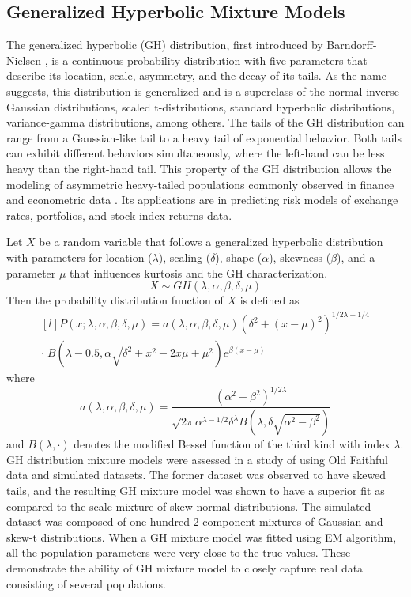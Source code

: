 \subsection{Generalized Hyperbolic Mixture Models}
\label{sec:ghd_ch3}
The generalized hyperbolic (GH) distribution, first introduced by Barndorff-Nielsen \cite{Barndorff1977}, is a continuous probability distribution with five parameters that describe its location, scale, asymmetry, and the decay of its tails. As the name suggests, this distribution is generalized and is a superclass of the normal inverse Gaussian distributions, scaled t-distributions, standard hyperbolic distributions, variance-gamma distributions, among others. The tails of the GH distribution can range from a Gaussian-like tail to a heavy tail of exponential behavior. Both tails can exhibit different behaviors simultaneously, where the left-hand can be less heavy than the right-hand tail. This property of the GH distribution allows the modeling of asymmetric heavy-tailed populations commonly observed in finance and econometric data \cite{Takahashi2016, Nwobi2014, Necula2009, Aas2006, Bibby2003}. Its applications are in predicting risk models of exchange rates, portfolios, and stock index returns data. 

Let \(X\) be a random variable that follows a generalized hyperbolic distribution with parameters for location (\(\lambda\)), scaling (\(\delta\)), shape (\(\alpha\)), skewness (\(\beta\)), and a parameter \(\mu\) that influences kurtosis and the GH characterization. 
\[
    X \sim GH(\lambda, \alpha, \beta, \delta, \mu)
\]
Then the probability distribution function of \(X\) is defined as
\begin{equation}
    \begin{aligned}[l]
    P(x; \lambda, \alpha, \beta, \delta, \mu) = a(\lambda, \alpha, \beta, \delta, \mu) (\delta^2+(x-\mu)^2)^{1/2\lambda-1/4} \\
    \cdot \; B(\lambda-0.5, \alpha\sqrt{\delta^2+x^2-2x\mu+\mu^2})e^{\beta(x-\mu)}
    \end{aligned}
\end{equation}
where
\[
    a(\lambda, \alpha, \beta, \delta, \mu) = \frac{(\alpha^2-\beta^2)^{1/2\lambda}}{\sqrt{2\pi}\alpha^{\lambda-1/2}\delta^\lambda B(\lambda, \delta\sqrt{\alpha^2 - \beta^2})}
\]
and \(B(\lambda, \cdot)\) denotes the modified Bessel function of the third kind with index \(\lambda\).
GH distribution mixture models were assessed in a study of  using Old Faithful data \cite{GeyserTimes} and simulated datasets. The former dataset was observed to have skewed tails, and the resulting GH mixture model was shown to have a superior fit as compared to the scale mixture of skew-normal distributions. The simulated dataset was composed of one hundred 2-component mixtures of Gaussian and skew-t distributions. When a GH mixture model was fitted using EM algorithm, all the population parameters were very close to the true values. These demonstrate the ability of GH mixture model to closely capture real data consisting of several populations.

